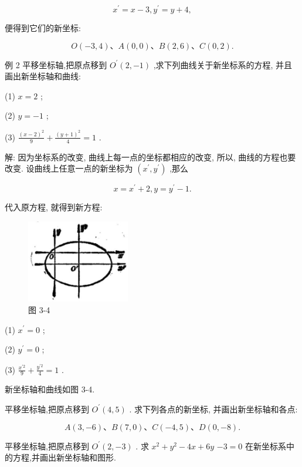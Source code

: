 \documentclass[lang=cn,newtx,10.5pt,scheme=chinese]{elegantbook}
\begin{document}
\[
    {x}^{\prime } = x - 3,{y}^{\prime } = y + 4,
\]

便得到它们的新坐标:

\[
  O\left( {-3,4}\right) \text{、}A\left( {0,0}\right) \text{、}B\left( {2,6}\right) \text{、}C\left( {0,2}\right) \text{.}
\]

例 2 平移坐标轴,把原点移到 \({O}^{\prime }\left( {2, - 1}\right)\) ,求下列曲线关于新坐标系的方程, 并且画出新坐标轴和曲线:

(1) \(x = 2\) ;

(2) \(y = - 1\) ;

(3) \(\frac{{\left( x - 2\right) }^{2}}{9} + \frac{{\left( y + 1\right) }^{2}}{4} = 1\) .

解: 因为坐标系的改变, 曲线上每一点的坐标都相应的改变, 所以, 曲线的方程也要改变. 设曲线上任意一点的新坐标为 \(\left( {{x}^{\prime },{y}^{\prime }}\right)\) ,那么

\[
  x = {x}^{\prime } + 2,y = {y}^{\prime } - 1.
\]

代入原方程, 就得到新方程:

\begin{figure}[h]
  \centering
  \includegraphics[max width=0.4\textwidth]{images/01912cc2-ffb6-728e-9ae7-b113ff05c64b_135_995645.jpg}
  \caption{图 3-4}
\end{figure}



(1) \({x}^{\prime } = 0\) ;

(2) \({y}^{\prime } = 0\) ;

(3) \(\frac{{x}^{\prime 2}}{9} + \frac{{y}^{\prime 2}}{4} = 1\) .

新坐标轴和曲线如图 3-4.

\begin{problemset}[练习]

\item 平移坐标轴,把原点移到 \({O}^{\prime }\left( {4,5}\right)\) . 求下列各点的新坐标, 并画出新坐标轴和各点:

\[
  A\left( {3, - 6}\right) \text{、}B\left( {7,0}\right) \text{、}C\left( {-4,5}\right) \text{、}D\left( {0, - 8}\right) .
\]

\item 平移坐标轴,把原点移到 \({O}^{\prime }\left( {2, - 3}\right)\) . 求 \({x}^{2} + {y}^{2} - {4x} + {6y}\) \(- 3 = 0\) 在新坐标系中的方程,并画出新坐标轴和图形.

\end{problemset}
\end{document}
